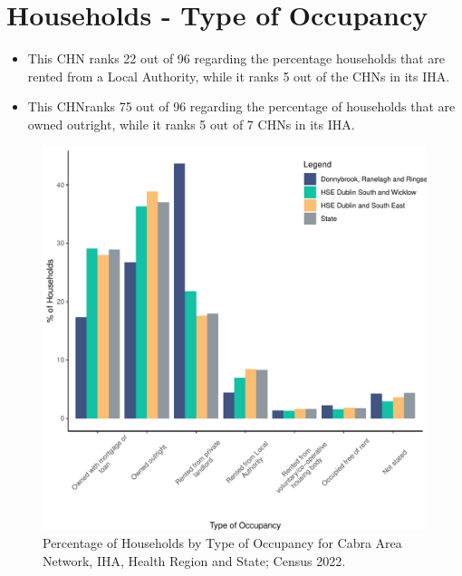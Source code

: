 \documentclass{article}
\begin{document}
\section{Households - Type of Occupancy}\label{sect:Households}
\begin{itemize}
\item This CHN ranks  22 out of 96 regarding the percentage households that are rented from a Local Authority, while it ranks  5 out of the CHNs in its IHA. 
\item This CHNranks  75 out of 96 regarding the percentage of households that are owned outright, while it ranks   5 out of 7 CHNs in its IHA.
\end{itemize}
\begin{figure}[H]
	\centering
	\includegraphics[width = 140mm]{../figures/HouseholdsED.pdf}
	\caption{Percentage of Households by Type of Occupancy for Cabra Area Network, IHA, Health Region and State; Census 2022.}
	\label{fig:vbnv}
	\end{figure}
\end{document}

